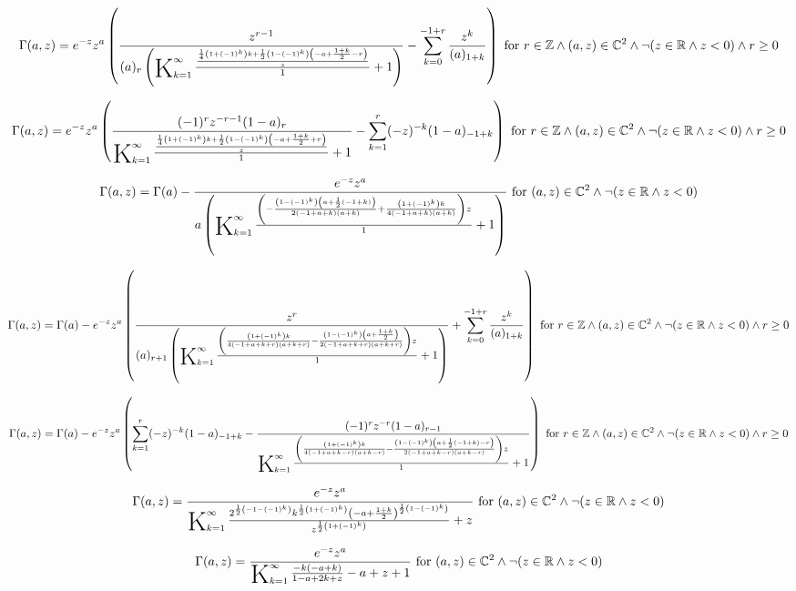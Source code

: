 \documentclass{article}
\newcommand{\bigK}{\mathop{\raisebox{-5pt}{\huge K}}}
\begin{document}
\[\Gamma (a,z)=e^{-z} z^a \left(\frac{z^{r-1}}{(a)_r \left(\bigK_{k=1}^{\infty}\frac{\frac{\frac{1}{4} \left(1+(-1)^k\right) k+\frac{1}{2} \left(1-(-1)^k\right) \left(-a+\frac{1+k}{2}-r\right)}{z}}{1}+1\right)}-\sum _{k=0}^{-1+r} \frac{z^k}{(a)_{1+k}}\right)\text{ for }r\in \mathbb{Z}\land (a,z)\in \mathbb{C}^2\land \neg (z\in \mathbb{R}\land z<0)\land r\geq 0\] 

\[\Gamma (a,z)=e^{-z} z^a \left(\frac{(-1)^r z^{-r-1} (1-a)_r}{\bigK_{k=1}^{\infty}\frac{\frac{\frac{1}{4} \left(1+(-1)^k\right) k+\frac{1}{2} \left(1-(-1)^k\right) \left(-a+\frac{1+k}{2}+r\right)}{z}}{1}+1}-\sum _{k=1}^r (-z)^{-k} (1-a)_{-1+k}\right)\text{ for }r\in \mathbb{Z}\land (a,z)\in \mathbb{C}^2\land \neg (z\in \mathbb{R}\land z<0)\land r\geq 0\] 

\[\Gamma (a,z)=\Gamma (a)-\frac{e^{-z} z^a}{a \left(\bigK_{k=1}^{\infty}\frac{\left(-\frac{\left(1-(-1)^k\right) \left(a+\frac{1}{2} (-1+k)\right)}{2 (-1+a+k) (a+k)}+\frac{\left(1+(-1)^k\right) k}{4 (-1+a+k) (a+k)}\right) z}{1}+1\right)}\text{ for }(a,z)\in \mathbb{C}^2\land \neg (z\in \mathbb{R}\land z<0)\] 

\[\Gamma (a,z)=\Gamma (a)-e^{-z} z^a \left(\frac{z^r}{(a)_{r+1} \left(\bigK_{k=1}^{\infty}\frac{\left(\frac{\left(1+(-1)^k\right) k}{4 (-1+a+k+r) (a+k+r)}-\frac{\left(1-(-1)^k\right) \left(a+\frac{1+k}{2}\right)}{2 (-1+a+k+r) (a+k+r)}\right) z}{1}+1\right)}+\sum _{k=0}^{-1+r} \frac{z^k}{(a)_{1+k}}\right)\text{ for }r\in \mathbb{Z}\land (a,z)\in \mathbb{C}^2\land \neg (z\in \mathbb{R}\land z<0)\land r\geq 0\] 

\[\Gamma (a,z)=\Gamma (a)-e^{-z} z^a \left(\sum _{k=1}^r (-z)^{-k} (1-a)_{-1+k}-\frac{(-1)^r z^{-r} (1-a)_{r-1}}{\bigK_{k=1}^{\infty}\frac{\left(\frac{\left(1+(-1)^k\right) k}{4 (-1+a+k-r) (a+k-r)}-\frac{\left(1-(-1)^k\right) \left(a+\frac{1}{2} (-1+k)-r\right)}{2 (-1+a+k-r) (a+k-r)}\right) z}{1}+1}\right)\text{ for }r\in \mathbb{Z}\land (a,z)\in \mathbb{C}^2\land \neg (z\in \mathbb{R}\land z<0)\land r\geq 0\] 

\[\Gamma (a,z)=\frac{e^{-z} z^a}{\bigK_{k=1}^{\infty}\frac{2^{\frac{1}{2} \left(-1-(-1)^k\right)} k^{\frac{1}{2} \left(1+(-1)^k\right)} \left(-a+\frac{1+k}{2}\right)^{\frac{1}{2} \left(1-(-1)^k\right)}}{z^{\frac{1}{2} \left(1+(-1)^k\right)}}+z}\text{ for }(a,z)\in \mathbb{C}^2\land \neg (z\in \mathbb{R}\land z<0)\] 

\[\Gamma (a,z)=\frac{e^{-z} z^a}{\bigK_{k=1}^{\infty}\frac{-k (-a+k)}{1-a+2 k+z}-a+z+1}\text{ for }(a,z)\in \mathbb{C}^2\land \neg (z\in \mathbb{R}\land z<0)\] 
\end{document}
